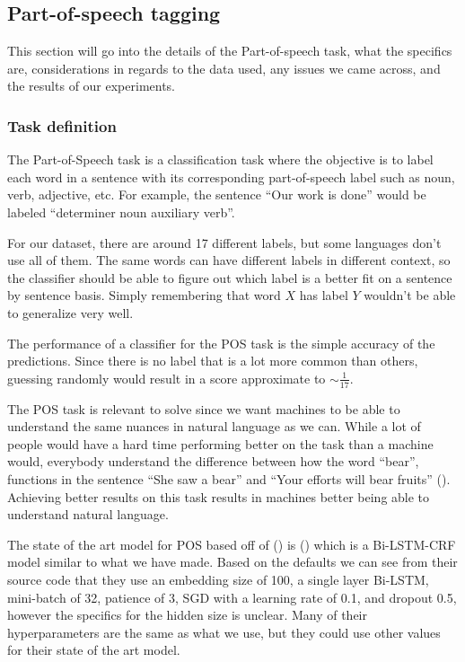 
\subsection{Part-of-speech tagging}

This section will go into the details of the Part-of-speech task, what the
specifics are, considerations in regards to the data used, any issues we came
across, and the results of our experiments.

\subsubsection{Task definition}

The Part-of-Speech task is a classification task where the objective is to label
each word in a sentence with its corresponding part-of-speech label such as
noun, verb, adjective, etc. For example, the sentence ``Our work is done'' would be
labeled ``determiner noun auxiliary verb''.

For our dataset, there are around 17 different labels, but some languages don't
use all of them. The same words can have different labels in different context,
so the classifier should be able to figure out which label is a better fit on a
sentence by sentence basis. Simply remembering that word $X$ has label $Y$
wouldn't be able to generalize very well.

The performance of a classifier for the POS task is the simple accuracy of the
predictions. Since there is no label that is a lot more common than others,
guessing randomly would result in a score approximate to $\sim\frac{1}{17}$.

The POS task is relevant to solve since we want machines to be able to
understand the same nuances in natural language as we can. While a lot of people
would have a hard time performing better on the task than a machine would,
everybody understand the difference between how the word ``bear'', functions in
the sentence ``She saw a bear'' and ``Your efforts will bear fruits''
(\cite{medium-pos-intro}). Achieving better results on this task results in
machines better being able to understand natural language.

The state of the art model for POS based off of (\cite{aclweb-pos-state}) is
(\cite{akbik2018coling}) which is a Bi-LSTM-CRF model similar to what we have
made. Based on the defaults we can see from their source code that they use an
embedding size of 100, a single layer Bi-LSTM, mini-batch of 32, patience of 3,
SGD with a learning rate of 0.1, and dropout 0.5, however the specifics for the
hidden size is unclear. Many of their hyperparameters are the same as what we
use, but they could use other values for their state of the art model. 

